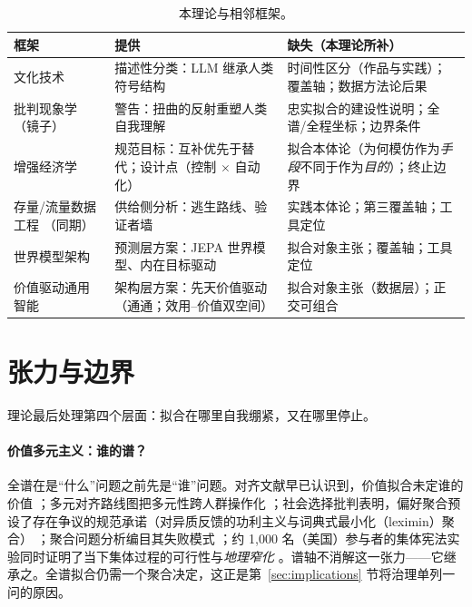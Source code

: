 \documentclass[10pt,fontset=fandol]{ctexart}
\begin{document}
\begin{table}[t]
\centering
\caption{本理论与相邻框架。}
\label{tab:frameworks}
\small
\begin{tabular}{p{}p{}p{}}
\toprule
框架 & 提供 & 缺失（本理论所补） \\
\midrule
文化技术 \cite{farrell2025cultural, yiu2024transmission} & 描述性分类：LLM 继承人类符号结构 & 时间性区分（作品与实践）；覆盖轴；数据方法论后果 \\
\addlinespace
批判现象学（镜子） \cite{vallor2024mirror} & 警告：扭曲的反射重塑人类自我理解 & 忠实拟合的建设性说明；全谱/全程坐标；边界条件 \\
\addlinespace
增强经济学 \cite{brynjolfsson2022turing, engelbart1962augmenting, shneiderman2022human} & 规范目标：互补优先于替代；设计点（控制 $\times$ 自动化） & 拟合本体论（为何模仿作为\emph{手段}不同于作为\emph{目的}）；终止边界 \\
\addlinespace
存量/流量数据工程 \cite{gharbi2026model}（同期） & 供给侧分析：逃生路线、验证者墙 & 实践本体论；第三覆盖轴；工具定位 \\
\addlinespace
世界模型架构 \cite{lecun2022path} & 预测层方案：JEPA 世界模型、内在目标驱动 & 拟合对象主张；覆盖轴；工具定位 \\
\addlinespace
价值驱动通用智能 \cite{zhao2024heart} & 架构层方案：先天价值驱动（通通；效用--价值双空间） & 拟合对象主张（数据层）；正交可组合 \\
\bottomrule
\end{tabular}
\end{table}

\section{张力与边界}\label{sec:tensions}

理论最后处理第四个层面：拟合在哪里自我绷紧，又在哪里停止。

\paragraph{价值多元主义：谁的谱？}
全谱在是“什么”问题之前先是“谁”问题。对齐文献早已认识到，价值拟合未定谁的价值 \cite{gabriel2020values}；多元对齐路线图把多元性跨人群操作化 \cite{sorensen2024roadmap}；社会选择批判表明，偏好聚合预设了存在争议的规范承诺（对异质反馈的功利主义与词典式最小化（leximin）聚合） \cite{park2024rlhf}；聚合问题分析编目其失败模式 \cite{baum2025aggregation}；约 1,000 名（美国）参与者的集体宪法实验同时证明了当下集体过程的可行性与\emph{地理窄化} \cite{huang2024collective}。谱轴不消解这一张力——它继承之。全谱拟合仍需一个聚合决定，这正是第~\ref{sec:implications} 节将治理单列一问的原因。
\end{document}
